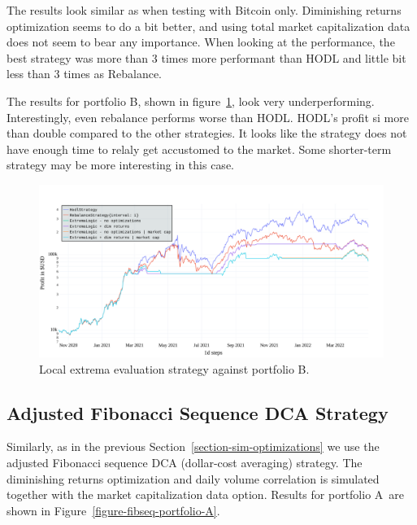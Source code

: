 The results look similar as when testing with Bitcoin only. Diminishing returns optimization seems to do a bit better, and using total market capitalization data does not seem to bear any importance. When looking at the performance, the best strategy was more than 3 times more performant than HODL and little bit less than 3 times as Rebalance.

The results for portfolio B, shown in figure~\ref{figure-extrema-portfolio-B}, look very underperforming. Interestingly, even rebalance performs worse than HODL. HODL's profit si more than double compared to the other strategies. It looks like the strategy does not have enough time to relaly get accustomed to the market. Some shorter-term strategy may be more interesting in this case.

\begin{figure}[!hbt]
    \centering
    \includegraphics[width=\columnwidth]{figures/extrema-portfolio-B.pdf}
    \caption{Local extrema evaluation strategy against portfolio B.}
    \label{figure-extrema-portfolio-B}
\end{figure}


\subsection*{Adjusted Fibonacci Sequence DCA Strategy}
Similarly, as in the previous Section~\ref{section-sim-optimizations} we use the adjusted Fibonacci sequence DCA (dollar-cost averaging) strategy. The diminishing returns optimization and daily volume correlation is simulated together with the market capitalization data option. Results for portfolio A~are shown in Figure~\ref{figure-fibseq-portfolio-A}.

